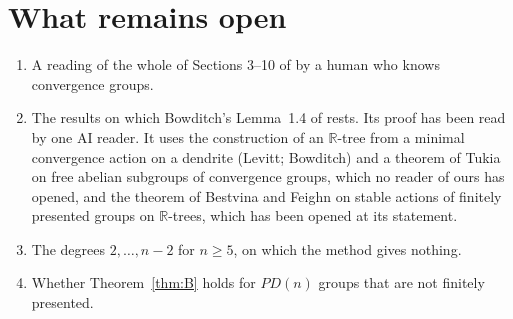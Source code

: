\documentclass[11pt,a4paper]{article}
\theoremstyle{definition}
\theoremstyle{remark}
\newcommand{\R}{\mathbb{R}}
\begin{document}
\section{What remains open}\label{sec:open}
\begin{enumerate}
\item A reading of the whole of Sections 3--10 of \cite{O} by a human who knows
convergence groups.
\item The results on which Bowditch's Lemma~1.4 of \cite{BoC} rests. Its proof
has been read by one AI reader. It uses the construction of an $\R$-tree from a
minimal convergence action on a dendrite (Levitt; Bowditch) and a theorem of
Tukia on free abelian subgroups of convergence groups, which no reader of ours
has opened, and the theorem of Bestvina and Feighn on stable actions of
finitely presented groups on $\R$-trees, which has been opened at its
statement.
\item The degrees $2,\dots,n-2$ for $n\ge5$, on which the method gives nothing.
\item Whether Theorem~\ref{thm:B} holds for $PD(n)$ groups that are not finitely
presented.
\end{enumerate}
\end{document}
